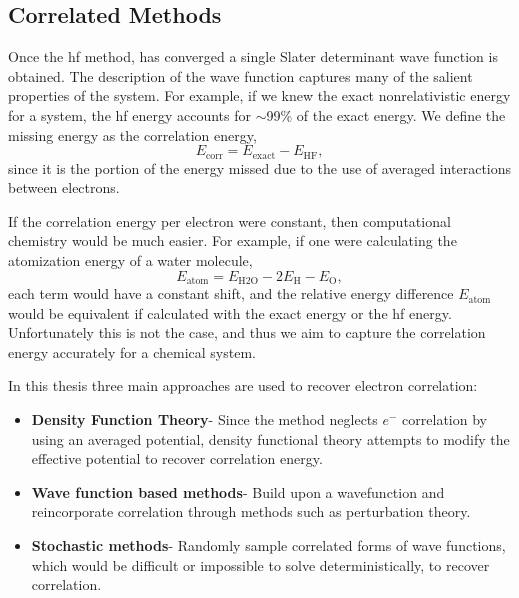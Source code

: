 \subsection{Correlated Methods}
Once the \gls{hf} method, has converged a single Slater determinant wave function is obtained.
The description of the wave function captures many of the salient properties of the system.
For example, if we knew the exact nonrelativistic energy for a system, the \gls{hf} energy accounts for $\sim$99\% of the exact energy.
We define the missing energy as the correlation energy,
\begin{equation}
E_{\mathrm{corr}} = E_{\mathrm{exact}} - E_{\mathrm{HF}},
\end{equation}
since it is the portion of the energy missed due to the use of averaged interactions between electrons.

If the correlation energy per electron were constant, then computational chemistry would be much easier.
For example, if one were calculating the atomization energy of a water molecule,
\begin{equation}
    E_{\mathrm{atom}} = E_{\mathrm{H2O}} - 2 E_{\mathrm{H}} - E_{\mathrm{O}},
\end{equation}
each term would have a constant shift, and the relative energy difference $E_{\mathrm{atom}}$ would be equivalent if calculated with the exact energy or the \gls{hf} energy.
Unfortunately this is not the case, and thus we aim to capture the correlation energy accurately for a chemical system.

In this thesis three main approaches are used to recover electron correlation:
\begin{itemize}
    \item \textbf{Density Function Theory}- Since the  method neglects $e^{-}$ correlation by using an averaged potential, density functional theory attempts to modify the effective potential to recover correlation energy.
    \item \textbf{Wave function based methods}- Build upon a  wavefunction and reincorporate correlation through methods such as perturbation theory.
\item \textbf{Stochastic methods}- Randomly sample correlated forms of wave functions, which would be difficult or impossible to solve deterministically, to recover correlation.
\end{itemize}
